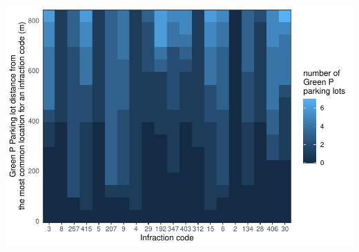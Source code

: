 \documentclass[
]{article}
\begin{document}
\includegraphics{main_1_files/figure-latex/Green P tile-1.pdf}
\end{document}
